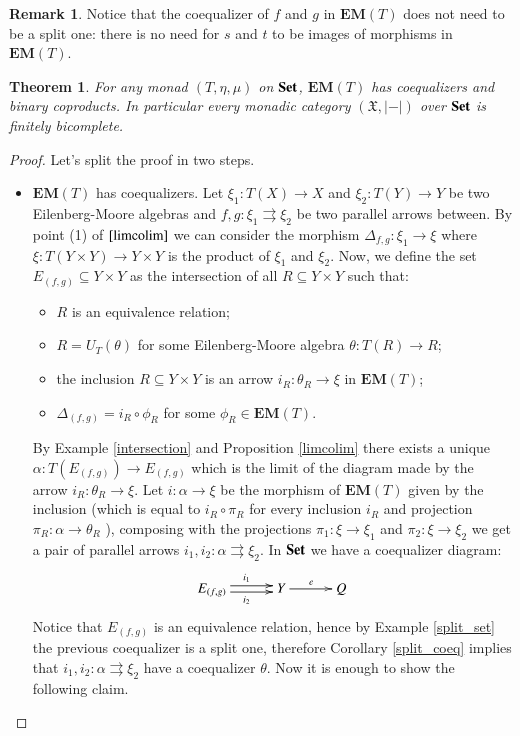 \documentclass[12pt]{article}
\newtheorem{theorem}[lemma]{Theorem}
\theoremstyle{definition}
\newtheorem{remark}[lemma]{Remark}
\def\X{\mathfrak X}
\newcommand{\Set}{\textbf{\textup{Set}}}
\newcommand{\eim}[1]{\mathbf{EM}{(#1)}}
\numberwithin{equation}{section}
\begin{document}
\begin{remark}Notice that the coequalizer of $f$ and $g$ in $\eim{T}$ does not need to be a split one: there is no need for $s$ and $t$ to be images of morphisms in $\eim{T}$.
\end{remark}
\begin{theorem}\label{bicomp}
	For any monad $(T, \eta, \mu)$ on $\Set$, $\eim{T}$ has coequalizers and binary coproducts. In particular every monadic category $(\X, |-|)$ over $\Set$ is finitely bicomplete.
\end{theorem} 
\begin{proof}Let's split the proof in two steps.
	\begin{itemize}
		\item $\eim{T}$ has coequalizers. Let  $\xi_1:T(X)\rightarrow X$ and $\xi_2:T(Y)\rightarrow Y$ be two Eilenberg-Moore algebras and $f,g:\xi_1\rightrightarrows\xi_2$ be two parallel arrows between. By point (1) of $\ref{limcolim}$ we can consider the morphism $\Delta_{f,g}:\xi_1\rightarrow \xi$ where $\xi:T(Y\times Y)\rightarrow Y\times Y$ is the product of $\xi_1$ and $\xi_2$. Now, we define the set $E_{(f,g)}\subseteq Y\times Y$ as the intersection of all $R\subseteq Y\times Y$ such that:
		\begin{itemize}
			\item $R$ is an equivalence relation;
			\item $R=U_T(\theta)$ for some Eilenberg-Moore algebra $\theta:T(R)\rightarrow R$;
			\item the inclusion $R\subseteq Y\times Y$ is an arrow $i_R:\theta_R\rightarrow \xi$ in $\eim{T}$;
			\item $\Delta_{(f,g)}=i_R\circ \phi_R$ for some $\phi_R\in \eim{T}$.
		\end{itemize}
	By Example \ref{intersection} and Proposition \ref{limcolim} there exists a unique $\alpha:T(E_{(f,g)})\rightarrow E_{(f,g)}$ which is the limit of the diagram made by the arrow $i_R:\theta_R\rightarrow \xi$. Let $i:\alpha \rightarrow \xi$ be the morphism of $\eim{T}$ given by the inclusion (which is equal to  $i_R\circ \pi_R$ for every inclusion $i_R$ and projection $\pi_R:\alpha\rightarrow \theta_R$ ), composing with the projections $\pi_1: \xi \rightarrow \xi_1$  and $\pi_2: \xi \rightarrow \xi_2$ we get a pair of parallel arrows $i_1, i_2:\alpha\rightrightarrows \xi_2$. In $\Set$ we have a coequalizer diagram:
	\[
	\xymatrix@C=30pt{
		E_{(f,g)}\ar@<-.5ex>[r]_{i_2}\ar@<.5ex>[r]^{i_1}&Y\ar[r]^{e}&Q 
	}
	\] 
	Notice that $E_{(f,g)}$ is an equivalence relation, hence by Example \ref{split_set} the previous coequalizer is a split one, therefore  Corollary \ref{split_coeq} implies that $i_1, i_2:\alpha \rightrightarrows \xi_2$ have a coequalizer $\theta$. Now it is enough to show the following claim.

\end{itemize}
\end{proof}
\end{document}
